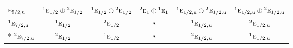 \documentclass[10pt,a4paper]{article}
\numberwithin{equation}{section}
\newcommand{\irr}[1]{\text{\normalfont\scshape #1}}
\newcommand{\conjpair}[1]{{}^{#1}}
\newcommand{\ptag}[1]{\mathrm{#1}}
\begin{document}
{\begin{longtable}{@{}lccccc@{}}
$\irr{e}_{5/2,\ptag{u}}$ & $\conjpair{1}\irr{e}_{1/2}\oplus \conjpair{2}\irr{e}_{1/2}$ & $\conjpair{1}\irr{e}_{1/2}\oplus \conjpair{2}\irr{e}_{1/2}$ & $\conjpair{2}\irr{e}_{1}\oplus \conjpair{1}\irr{e}_{1}$ & $\conjpair{1}\irr{e}_{1/2,\ptag{u}}\oplus \conjpair{2}\irr{e}_{1/2,\ptag{u}}$ & $\conjpair{1}\irr{e}_{1/2,\ptag{u}}\oplus \conjpair{2}\irr{e}_{1/2,\ptag{u}}$\\
$\conjpair{1}\irr{e}_{7/2,\ptag{u}}$ & $\conjpair{1}\irr{e}_{1/2}$ & $\conjpair{2}\irr{e}_{1/2}$ & $\irr{a}$ & $\conjpair{1}\irr{e}_{1/2,\ptag{u}}$ & $\conjpair{2}\irr{e}_{1/2,\ptag{u}}$\\*
$\conjpair{2}\irr{e}_{7/2,\ptag{u}}$ & $\conjpair{2}\irr{e}_{1/2}$ & $\conjpair{1}\irr{e}_{1/2}$ & $\irr{a}$ & $\conjpair{2}\irr{e}_{1/2,\ptag{u}}$ & $\conjpair{1}\irr{e}_{1/2,\ptag{u}}$\\
\bottomrule\end{longtable}}
\end{document}
